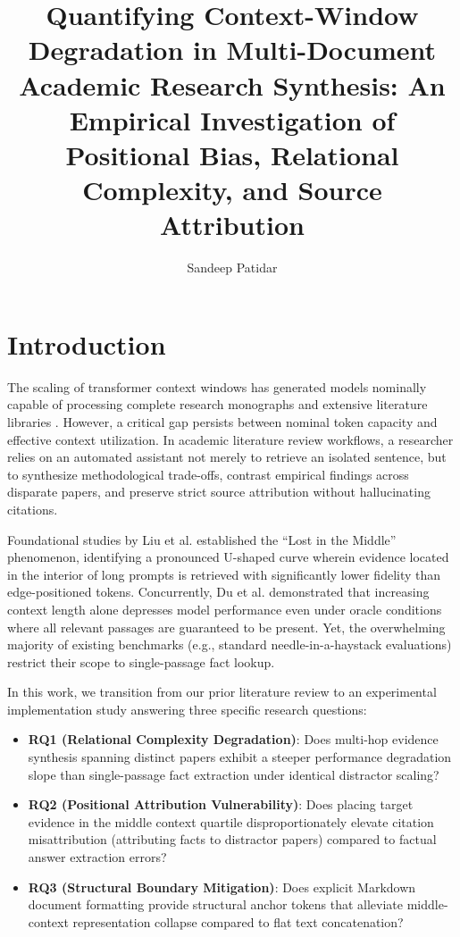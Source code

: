 \documentclass[manuscript,screen,oneside]{acmart}
\title{Quantifying Context-Window Degradation in Multi-Document Academic Research Synthesis: An Empirical Investigation of Positional Bias, Relational Complexity, and Source Attribution}
\author{Sandeep Patidar}
\affiliation{%
  \institution{Indian Institute of Information Technology Allahabad}
  \city{Prayagraj}
  \state{Uttar Pradesh}
  \country{India}
}
\begin{document}
\maketitle

\section{Introduction}\label{sec:intro}
The scaling of transformer context windows has generated models nominally capable of processing complete research monographs and extensive literature libraries \cite{vaswani2017attention,chen2023extending}. However, a critical gap persists between nominal token capacity and effective context utilization. In academic literature review workflows, a researcher relies on an automated assistant not merely to retrieve an isolated sentence, but to synthesize methodological trade-offs, contrast empirical findings across disparate papers, and preserve strict source attribution without hallucinating citations.

Foundational studies by Liu et al. \cite{liu2024lost} established the ``Lost in the Middle'' phenomenon, identifying a pronounced U-shaped curve wherein evidence located in the interior of long prompts is retrieved with significantly lower fidelity than edge-positioned tokens. Concurrently, Du et al. \cite{du2025contextlength} demonstrated that increasing context length alone depresses model performance even under oracle conditions where all relevant passages are guaranteed to be present. Yet, the overwhelming majority of existing benchmarks (e.g., standard needle-in-a-haystack evaluations) restrict their scope to single-passage fact lookup. 

In this work, we transition from our prior literature review to an experimental implementation study answering three specific research questions:
\begin{itemize}
    \item \textbf{RQ1 (Relational Complexity Degradation)}: Does multi-hop evidence synthesis spanning distinct papers exhibit a steeper performance degradation slope than single-passage fact extraction under identical distractor scaling?
    \item \textbf{RQ2 (Positional Attribution Vulnerability)}: Does placing target evidence in the middle context quartile disproportionately elevate citation misattribution (attributing facts to distractor papers) compared to factual answer extraction errors?
    \item \textbf{RQ3 (Structural Boundary Mitigation)}: Does explicit Markdown document formatting provide structural anchor tokens that alleviate middle-context representation collapse compared to flat text concatenation?
\end{itemize}
\end{document}
